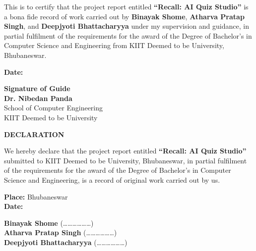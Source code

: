 \documentclass[12pt, a4paper]{report}
\newcommand{\ProjectTitle}{Recall: AI Quiz Studio}
\newcommand{\GuideName}{Dr. Nibedan Panda}
\newcommand{\SubmissionDate}{\underline{\hspace{3cm}}}
\newcommand{\MemberOne}{Binayak Shome}   \newcommand{\RollOne}{23051338}
\newcommand{\MemberTwo}{Atharva Pratap Singh}   \newcommand{\RollTwo}{23052068}
\newcommand{\MemberThree}{Deepjyoti Bhattacharyya} \newcommand{\RollThree}{23053381}
\begin{document}
This is to certify that the project report entitled \textbf{``\ProjectTitle''} is a bona fide record of work carried out by \textbf{\MemberOne}, \textbf{\MemberTwo}, and \textbf{\MemberThree} under my supervision and guidance, in partial fulfilment of the requirements for the award of the Degree of Bachelor's in Computer Science and Engineering from KIIT Deemed to be University, Bhubaneswar.

\vfill
\noindent
\begin{minipage}[t]{0.45\textwidth}
\vspace{2cm}
\textbf{Date:} \SubmissionDate
\end{minipage}\hfill
\begin{minipage}[t]{0.5\textwidth}
\raggedleft
\textbf{Signature of Guide}\\[1cm]
\textbf{\GuideName}\\[0.2cm]
School of Computer Engineering\\
KIIT Deemed to be University
\end{minipage}
\vspace*{1cm}

\newpage
{}
{}
\begin{center}
{\LARGE \textbf{DECLARATION}}\\[1cm]
\end{center}

We hereby declare that the project report entitled \textbf{``\ProjectTitle''} submitted to KIIT Deemed to be University, Bhubaneswar, in partial fulfilment of the requirements for the award of the Degree of Bachelor's in Computer Science and Engineering, is a record of original work carried out by us.

\vfill
\noindent
\begin{minipage}[b]{0.4\textwidth}
\textbf{Place:} Bhubaneswar\\[0.3cm]
\textbf{Date:} \SubmissionDate
\end{minipage}\hfill
\begin{minipage}[b]{0.6\textwidth}
\raggedleft
\textbf{\MemberOne} (\dots\dots\dots\dots\dots\dots)\\[0.2cm]
\textbf{\MemberTwo} (\dots\dots\dots\dots\dots\dots)\\[0.2cm]
\textbf{\MemberThree} (\dots\dots\dots\dots\dots\dots)\\[0.2cm]
\end{minipage}
\vspace*{1cm}
\end{document}
